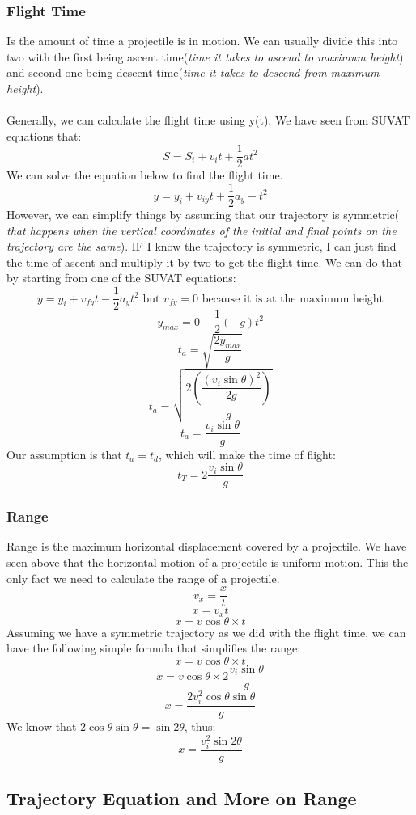 \documentclass[9pt]{article}
\begin{document}
	\subsubsection*{Flight Time}
	Is the amount of time a projectile is in motion. We can usually divide this into two with the first being ascent time(\textit{time it takes to ascend to maximum height}) and second one being descent time(\textit{time it takes to descend from maximum height}). \\ \\
	Generally, we can calculate the flight time using y(t). We have seen from SUVAT equations that:
	$$S=S_i+v_it+\dfrac{1}{2}at^2$$
	We can solve the equation below to find the flight time. 
	$$y=y_i+v_{iy}t+\dfrac{1}{2}a_y-t^2$$
	However, we can simplify things by assuming that our trajectory is symmetric( \textit{that happens when the vertical coordinates of the initial and final points on the trajectory are the same}). IF I know the trajectory is symmetric, I can just find the time of ascent and multiply it by two to get the flight time. We can do that by starting from one of the SUVAT equations:
	$$y=y_i+v_{fy}t-\dfrac{1}{2}a_yt^2\text{ but }v_{fy}=0\text{ because it is at the maximum height}$$
	$$y_{max}=0-\dfrac{1}{2}(-g)t^2$$
	$$t_a=\sqrt{\dfrac{2y_{max}}{g}}$$
	$$t_a=\sqrt{\dfrac{2(\dfrac{(v_i\sin\theta)^2}{2g})}{g}}$$
	$$t_a=\dfrac{v_i\sin\theta}{g}$$
	Our assumption is that $t_a=t_d$, which will make the time of flight:
	$$t_T=2\dfrac{v_i\sin\theta}{g}$$
	\subsubsection*{Range}
	Range is the maximum horizontal displacement covered by a projectile. We have seen above that the horizontal motion of a projectile is uniform motion. This the only fact we need to calculate the range of a projectile.
	$$v_x=\dfrac{x}{t}$$
	$$x=v_xt$$
	$$x=v\cos\theta\times t$$
	Assuming we have a symmetric trajectory as we did with the flight time, we can have the following simple formula that simplifies the range:
	$$x=v\cos\theta\times t$$
	$$x=v\cos\theta\times2\dfrac{v_i\sin\theta}{g}$$
	$$x=\dfrac{2v_i^2\cos\theta\sin\theta}{g}$$
	We know that $2\cos\theta\sin\theta=\sin2\theta$, thus:
	$$x=\dfrac{v_i^2\sin2\theta}{g}$$
	\subsection*{Trajectory Equation and More on Range}
\end{document}

